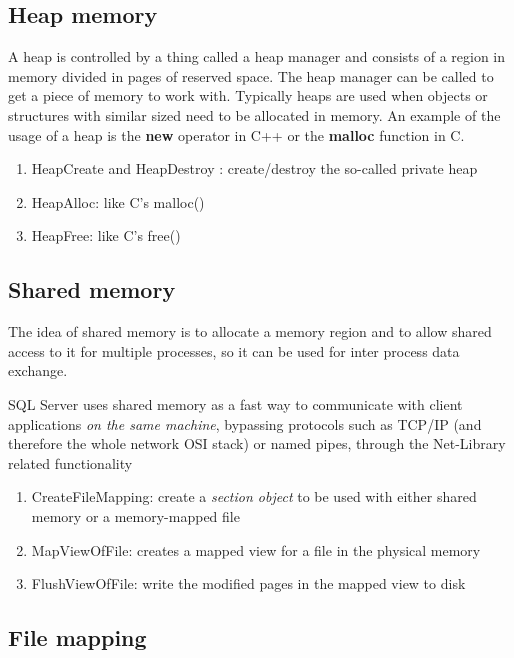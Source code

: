 \subsection{Heap memory}

A heap is controlled by a thing called a heap manager and consists of a region
in memory divided in pages of reserved space. The heap manager can be called to
get a piece of memory to work with. Typically heaps are used when objects or
structures with similar sized need to be allocated in memory. An example of the
usage of a heap is the {\bf new} operator in C++ or the {\bf malloc} function in
C.
\begin{enumerate}
  \item HeapCreate and HeapDestroy : create/destroy the so-called private heap
  \item HeapAlloc: like C's malloc()
  \item HeapFree: like C's free()
\end{enumerate}

\subsection{Shared memory}

The idea of shared memory is to allocate a memory region and to allow shared
access to it for multiple processes, so it can be used for inter process data
exchange. 

SQL Server uses shared memory as a fast way to communicate with client
applications {\it on the same machine}, bypassing protocols such as TCP/IP (and
therefore the whole network OSI stack) or named pipes, through the Net-Library
related functionality  

\begin{enumerate}
  \item CreateFileMapping: create a {\it section object} to be used with either
  shared memory or a memory-mapped file
  
  \item MapViewOfFile: creates a mapped view for a file in the physical memory
  
  \item FlushViewOfFile: write the modified pages in the mapped view to disk
\end{enumerate}

\subsection{File mapping}
\label{sec:FileMapping-Win32}

